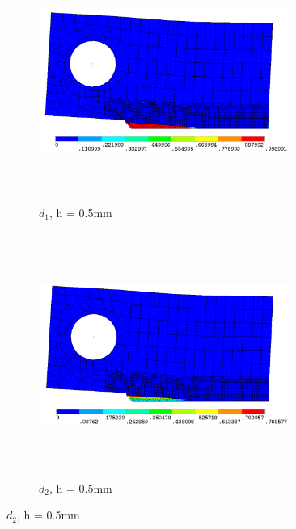 \documentclass[12pt,a4paper,twoside,openright]{report}
\begin{document}
\begin{figure}[htbp!]\ContinuedFloat 
     \begin{subfigure}{0.4\textwidth}
         \includegraphics[width=8.2cm,height=8cm,keepaspectratio]{26.d1-0.5.png}
         \caption{$d_{1}$, h = 0.5mm}
         \label{fig:d1-0.5}
     \end{subfigure}   
     \hspace{2cm}
     \begin{subfigure}{0.4\textwidth}
         \includegraphics[width=8.2cm,height=8cm,keepaspectratio]{26.d2-0.5.png}
         \caption{$d_{2}$, h = 0.5mm}
         \label{fig:d2-0.5}
     \end{subfigure}
\end{figure}
\FloatBarrier
\end{document}
